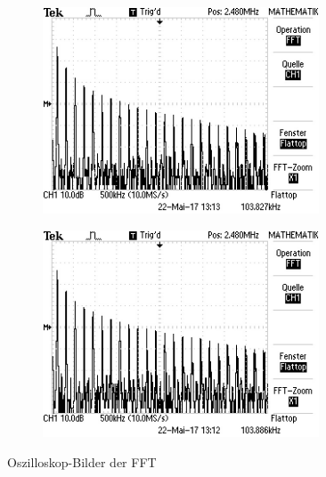 \begin{figure}[h]
	\centering
	\begin{subfigure}{0.495\textwidth}
		\centering
		\includegraphics[width=0.9\textwidth]{Oszilloskop/DaempfungLang/F0042TEK.JPG}
		\label{fig:FFTLang}
	\end{subfigure}
	\begin{subfigure}{0.495\textwidth}
		\centering
		\includegraphics[width=0.9\textwidth]{Oszilloskop/DaempfungKurz/F0041TEK.JPG}
		\label{fig:FFTKurz}
	\end{subfigure}
\caption{Oszilloskop-Bilder der FFT}
\label{fig:FFT}
\end{figure}


